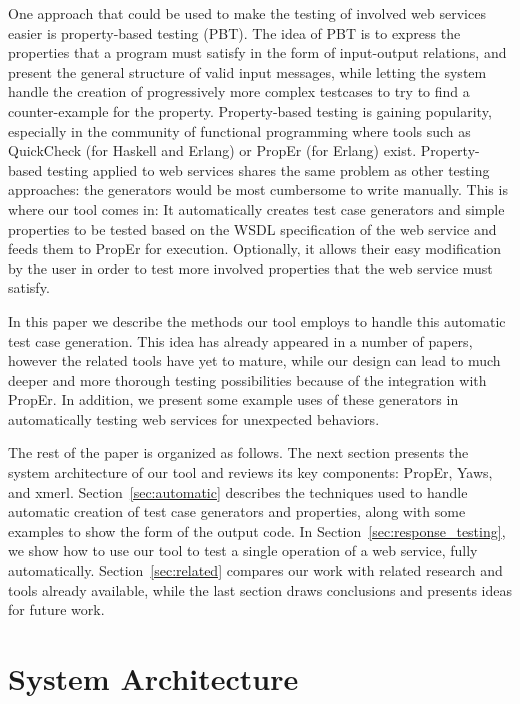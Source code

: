 \documentclass[submission,copyright,a4]{eptcs}
\begin{document}
One approach that could be used to make the testing of involved web
services easier is property-based testing (PBT). The idea of PBT is to
express the properties that a program must satisfy in the form of
input-output relations, and present the general structure of valid
input messages, while letting the system handle the creation of
progressively more complex testcases to try to find a counter-example
for the property. Property-based testing is gaining popularity,
especially in the community of functional programming where tools such
as QuickCheck (for Haskell and Erlang) or PropEr (for Erlang) exist.
%
Property-based testing applied to web services shares the same problem
as other testing approaches: the generators would be most cumbersome
to write manually. This is where our tool comes in: It automatically
creates test case generators and simple properties to be tested based
on the WSDL specification of the web service and feeds them to PropEr
for execution. Optionally, it allows their easy modification by the
user in order to test more involved properties that the web service
must satisfy.


In this paper we describe the methods our tool employs to handle this
automatic test case generation. This idea has already appeared in a
number of papers, however the related tools have yet to mature, while
our design can lead to much deeper and more thorough testing
possibilities because of the integration with PropEr. In addition, we
present some example uses of these generators in automatically testing
web services for unexpected behaviors.


The rest of the paper is organized as follows.
The next section presents the system architecture of our tool and
reviews its key components: PropEr, Yaws, and xmerl.
Section~\ref{sec:automatic} describes the techniques used to handle
automatic creation of test case generators and properties, along with
some examples to show the form of the output code.
In Section~\ref{sec:response_testing}, we show how to use our tool to
test a single operation of a web service, fully automatically.
Section~\ref{sec:related} compares our work with related research and
tools already available, while the last section draws conclusions and
presents ideas for future work.

\section{System Architecture} \label{sec:architecture}
\end{document}
